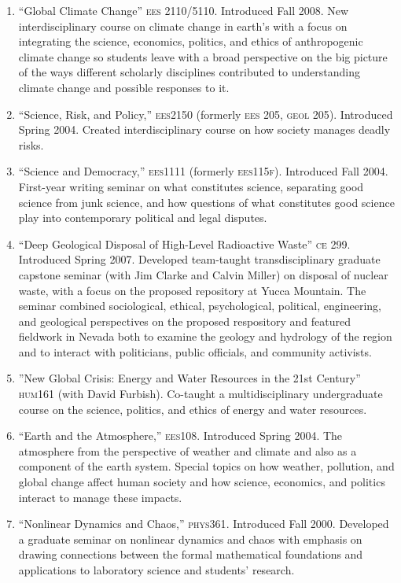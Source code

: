 \begin{enumerate}
\item ``Global Climate Change'' \textsc{ees 2110/5110}. Introduced Fall 2008. New interdisciplinary course on climate change in earth's with a focus on integrating the science, economics, politics, and ethics of anthropogenic climate change so students leave with a broad perspective on the big picture of the ways different scholarly disciplines contributed to understanding climate change and possible responses to it.
\item ``Science, Risk, and Policy,'' \textsc{ees2150} (formerly \textsc{ees 205}, \textsc{geol 205}). Introduced Spring 2004. Created interdisciplinary course on how society manages deadly risks.
\item ``Science and Democracy,'' \textsc{ees1111} (formerly \textsc{ees115f}). Introduced Fall 2004.  First-year writing seminar on what constitutes science, separating good science from junk science, and how questions of what constitutes good science play into contemporary political and legal disputes.
\item ``Deep Geological Disposal of High-Level Radioactive Waste'' \textsc{ce 299}. Introduced Spring 2007. Developed team-taught transdisciplinary graduate capstone seminar (with Jim Clarke and Calvin Miller) on disposal of nuclear waste, with a focus on the proposed repository at Yucca Mountain. The seminar combined sociological, ethical, psychological, political, engineering, and geological perspectives on the proposed respository and featured fieldwork in Nevada both to examine the geology and hydrology of the region and to interact with politicians, public officials, and community activists.
\item ''New Global Crisis: Energy and Water Resources in the 21st Century'' \textsc{hum161} (with David Furbish). Co-taught a multidisciplinary undergraduate course on the science, politics, and ethics of energy and water resources.
\item ``Earth and the Atmosphere,'' \textsc{ees108}. Introduced Spring 2004. The atmosphere from the perspective of weather and climate and also as a component of the earth system. Special topics on how weather, pollution, and global change affect human society and how science, economics, and politics interact to manage these impacts.
\item ``Nonlinear Dynamics and Chaos,'' \textsc{phys361}. Introduced Fall 2000. Developed a graduate seminar on nonlinear dynamics and chaos with emphasis on drawing connections between the formal mathematical foundations and applications to laboratory science and students' research.

\end{enumerate}
